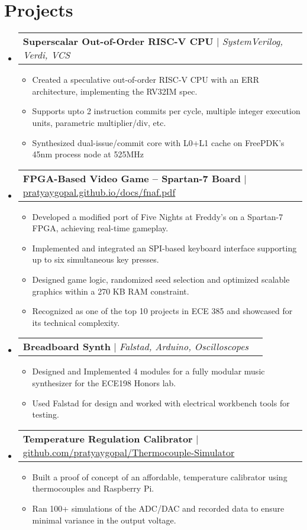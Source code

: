 \documentclass[letterpaper,11pt]{article}
\makeatletter
\newcommand{\resumeItem}[1]{
  \item\small{
    {#1 \vspace{-2pt}}
  }
}
\newcommand{\resumeProjectHeading}[2]{
    \item
    \begin{tabular*}{0.97\textwidth}{l@{\extracolsep{\fill}}r}
      \small#1 & #2 \\
    \end{tabular*}\vspace{-7pt}
}
\newcommand{\resumeSubHeadingListStart}{\begin{itemize}[leftmargin=0.15in, label={}]}
\newcommand{\resumeSubHeadingListEnd}{\end{itemize}}
\newcommand{\resumeItemListStart}{\begin{itemize}}
\newcommand{\resumeItemListEnd}{\end{itemize}\vspace{-5pt}}
\makeatother
\begin{document}
\section{Projects}
    \resumeSubHeadingListStart
        \resumeProjectHeading
          {\textbf{Superscalar Out-of-Order RISC-V CPU} $|$ \emph{SystemVerilog, Verdi, VCS}}{}
          \resumeItemListStart
            \resumeItem{Created a speculative out-of-order RISC-V CPU with an ERR architecture, implementing the RV32IM spec.}
            \resumeItem{ Supports upto 2 instruction commits per cycle, multiple integer execution units, parametric multiplier/div, etc.}
            \resumeItem{Synthesized dual-issue/commit core with L0+L1 cache on FreePDK’s 45nm process node at 525MHz}
          \resumeItemListEnd
        \resumeProjectHeading
          {\textbf{FPGA-Based Video Game – Spartan-7 Board} $|${\fontfamily{qcr} \small \href{https://pratyaygopal.github.io/docs/fnaf.pdf}{pratyaygopal.github.io/docs/fnaf.pdf}}}{}
          \resumeItemListStart
            \resumeItem{Developed a modified port of Five Nights at Freddy’s on a Spartan-7 FPGA, achieving real-time gameplay.}
            \resumeItem{Implemented and integrated an SPI-based keyboard interface supporting up to six simultaneous key presses.}
            \resumeItem{Designed game logic, randomized seed selection and optimized scalable graphics within a 270 KB RAM constraint.}
            \resumeItem{Recognized as one of the top 10 projects in ECE 385 and showcased for its technical complexity.}
          \resumeItemListEnd
        \resumeProjectHeading
          {\textbf{Breadboard Synth} $|$ \emph{Falstad, Arduino, Oscilloscopes}}{}
          \resumeItemListStart
            \resumeItem{Designed and Implemented 4 modules for a fully modular music synthesizer for the ECE198 Honors lab.}
            \resumeItem{Used Falstad for design and worked with electrical workbench tools for testing.}
          \resumeItemListEnd
        \resumeProjectHeading
          {\textbf{Temperature Regulation Calibrator} $|${\fontfamily{qcr} \small \href{https://github.com/pratyaygopal/Thermocouple-Simulator}{github.com/pratyaygopal/Thermocouple-Simulator}}}{}
          \resumeItemListStart
            \resumeItem{Built a proof of concept of an affordable, temperature calibrator using thermocouples and Raspberry Pi.}
            \resumeItem{Ran 100+ simulations of the ADC/DAC and recorded data to ensure minimal variance in the output voltage.}
          \resumeItemListEnd

    \resumeSubHeadingListEnd
\end{document}
